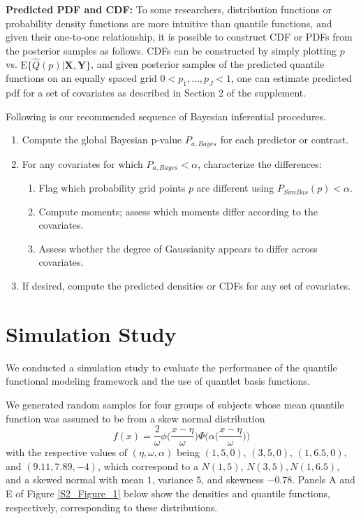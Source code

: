 \documentclass[11pt]{article}
\begin{document}
\textbf{Predicted PDF and CDF:}  
To some researchers, distribution functions or probability density functions are more intuitive than quantile functions, and given their one-to-one relationship, it is possible to construct CDF or PDFs from the posterior samples as follows.  CDFs can be constructed by simply plotting $p$ vs. $\text{E}\{\hat{Q}(p)|\mathbf{X},\mathbf{Y}\}$, and given posterior samples of the predicted quantile functions on an equally spaced grid $0<p_1, \ldots, p_J<1$, one can estimate predicted pdf for a set of covariates as described in Section 2 of the supplement. 

 \noindent Following is our recommended sequence of Bayesian inferential procedures.
 \begin{enumerate}[1.]
 \item Compute the global Bayesian p-value $P_{a,Bayes}$ for each predictor or contrast. 
\item For any covariates for which $P_{a,Bayes}<\alpha$, characterize the differences:
\vspace{-0.4cm}
 \begin{enumerate}[2a.]
\item Flag which probability grid points $p$ are different using $P_{SimBas}(p)<\alpha$.
\item  Compute moments; assess which moments differ according to the covariates.
\item  Assess whether the degree of Gaussianity appears to differ across covariates.
 \end{enumerate}
 \vspace{-0.4cm}
\item If desired, compute the predicted densities or CDFs for any set of covariates.
 \end{enumerate}


\section{ {\bf Simulation Study}}


We conducted a simulation study to evaluate the performance of the quantile functional modeling framework and the use of quantlet basis functions.

We generated random samples for four groups of subjects whose mean quantile function was assumed to be from a skew normal distribution
 \begin{equation}
f(x)=\frac{2}{\omega} \phi \biggl ( \frac{x-\eta}{\omega} \biggr )  
\Phi \biggl ( \alpha   \biggl ( \frac{x-\eta}{\omega} \biggr )  \biggr )  
  \label{skewnormal} 
 \end{equation}
with the respective values of $(\eta, \omega, \alpha)$  being
$(1, 5, 0)$, $(3, 5, 0)$, $(1, 6.5, 0)$, and $(9.11, 7.89, -4)$, which correspond to a $N(1,5)$, $ N(3,5), N(1,6.5)$, and a skewed normal with mean $1$, variance $5$, and skewness $-0.78$.    
Panels A and E of Figure \ref{S2_Figure_1} below show the densities
and quantile functions, respectively, corresponding to these distributions.
 
\end{document}
